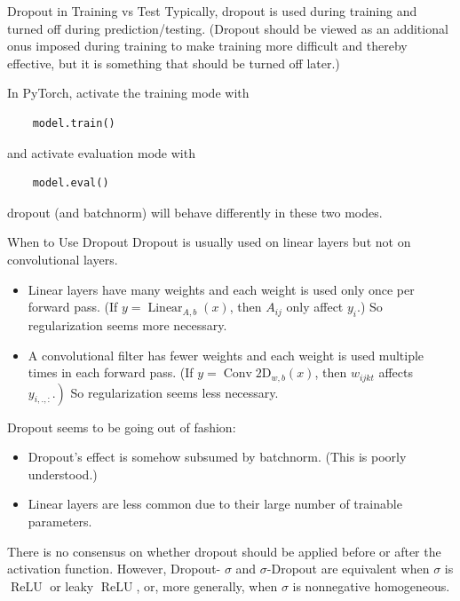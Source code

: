 \begin{frame}[allowframebreaks]

\begin{myconceptblock}{6.14}{Dropout in Training vs Test}
    Typically, dropout is used during training and turned off during prediction/testing.
    (Dropout should be viewed as an additional onus imposed during training to make training more difficult and thereby effective, but it is something that should be turned off later.)

    In PyTorch, activate the training mode with

    \begin{verbatim}
    model.train()
    \end{verbatim}

    and activate evaluation mode with

    \begin{verbatim}
    model.eval()
    \end{verbatim}

    dropout (and batchnorm) will behave differently in these two modes.
\end{myconceptblock}

\end{frame}

\begin{frame}[allowframebreaks]

\begin{myconceptblock}{6.15}{When to Use Dropout}
    Dropout is usually used on linear layers but not on convolutional layers.

    \begin{itemize}
        \item Linear layers have many weights and each weight is used only once per forward pass. (If $y=\operatorname{Linear}_{A, b}(x)$, then $A_{i j}$ only affect $y_{i}$.) So regularization seems more necessary.
        \item A convolutional filter has fewer weights and each weight is used multiple times in each forward pass. (If $y=\operatorname{Conv} 2 \mathrm{D}_{w, b}(x)$, then $w_{i j k t}$ affects $\left.y_{i, .,:}.\right)$ So regularization seems less necessary.
    \end{itemize}

    Dropout seems to be going out of fashion:

    \begin{itemize}
        \item Dropout's effect is somehow subsumed by batchnorm. (This is poorly understood.)
        \item Linear layers are less common due to their large number of trainable parameters.
    \end{itemize}

    There is no consensus on whether dropout should be applied before or after the activation function. However, Dropout- $\sigma$ and $\sigma$-Dropout are equivalent when $\sigma$ is $\operatorname{ReLU}$ or leaky $\operatorname{ReLU}$, or, more generally, when $\sigma$ is nonnegative homogeneous.
\end{myconceptblock}

\end{frame}

